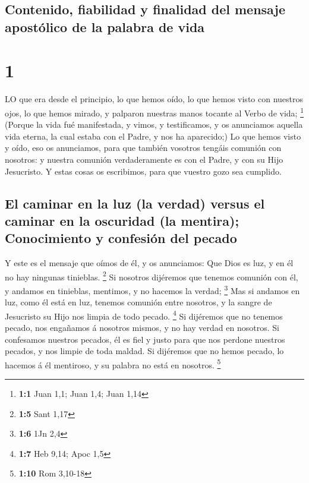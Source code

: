 \hypertarget{contenido-fiabilidad-y-finalidad-del-mensaje-apostuxf3lico-de-la-palabra-de-vida}{%
\subsection{Contenido, fiabilidad y finalidad del mensaje apostólico de
la palabra de
vida}\label{contenido-fiabilidad-y-finalidad-del-mensaje-apostuxf3lico-de-la-palabra-de-vida}}

\hypertarget{section}{%
\section{1}\label{section}}

 LO que era desde el principio, lo que hemos oído, lo que
hemos visto con nuestros ojos, lo que hemos mirado, y palparon nuestras
manos tocante al Verbo de vida; \footnote{\textbf{1:1} Juan 1,1; Juan
  1,4; Juan 1,14}  (Porque la vida fué manifestada, y vimos,
y testificamos, y os anunciamos aquella vida eterna, la cual estaba con
el Padre, y nos ha aparecido;)  Lo que hemos visto y oído,
eso os anunciamos, para que también vosotros tengáis comunión con
nosotros: y nuestra comunión verdaderamente es con el Padre, y con su
Hijo Jesucristo.  Y estas cosas os escribimos, para que
vuestro gozo sea cumplido.

\hypertarget{el-caminar-en-la-luz-la-verdad-versus-el-caminar-en-la-oscuridad-la-mentira-conocimiento-y-confesiuxf3n-del-pecado}{%
\subsection{El caminar en la luz (la verdad) versus el caminar en la
oscuridad (la mentira); Conocimiento y confesión del
pecado}\label{el-caminar-en-la-luz-la-verdad-versus-el-caminar-en-la-oscuridad-la-mentira-conocimiento-y-confesiuxf3n-del-pecado}}

 Y este es el mensaje que oímos de él, y os anunciamos: Que
Dios es luz, y en él no hay ningunas tinieblas. \footnote{\textbf{1:5}
  Sant 1,17}  Si nosotros dijéremos que tenemos comunión con
él, y andamos en tinieblas, mentimos, y no hacemos la verdad;
\footnote{\textbf{1:6} 1Jn 2,4}  Mas si andamos en luz, como
él está en luz, tenemos comunión entre nosotros, y la sangre de
Jesucristo su Hijo nos limpia de todo pecado. \footnote{\textbf{1:7} Heb
  9,14; Apoc 1,5}  Si dijéremos que no tenemos pecado, nos
engañamos á nosotros mismos, y no hay verdad en nosotros. 
Si confesamos nuestros pecados, él es fiel y justo para que nos perdone
nuestros pecados, y nos limpie de toda maldad.  Si
dijéremos que no hemos pecado, lo hacemos á él mentiroso, y su palabra
no está en nosotros. \footnote{\textbf{1:10} Rom 3,10-18}

